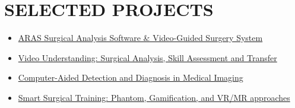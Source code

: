 \documentclass[11pt,a4paper,sans]{moderncv} %
\begin{document}
		\section{SELECTED PROJECTS}
	\begin{itemize}
		\item \href{https://aras.kntu.ac.ir/research-themes/ai-and-vr-in-medical-robotics/#:~:text=Real%2DTime%20Analyzer%20(-,ESERA,-)%0AThis%20software}{\authorimg{Images/aras.png} ARAS Surgical Analysis Software \& Video-Guided Surgery System} 
		
        \vspace{1em}
          \item \href{https://aras.kntu.ac.ir/research-themes/ai-and-vr-in-medical-robotics/#:~:text=Video%20Understanding%20in%20Medical%20Application%3A%20Surgical%20Analysis%2C%20Skill%20Assessment%20and%20Transfer}{\authorimg{Images/aras.png} Video Understanding: Surgical Analysis, Skill Assessment and Transfer} 
        \vspace{1em}
          \item \href{https://aras.kntu.ac.ir/research-themes/ai-and-vr-in-medical-robotics/#:~:text=Computer%2DAided%20Detection%20and%20Diagnosis%20in%20Medical%20Imaging}{\authorimg{Images/aras.png} Computer-Aided Detection and Diagnosis in Medical Imaging} 
        \vspace{1em}
          \item \href{https://aras.kntu.ac.ir/research-themes/ai-and-vr-in-medical-robotics/#:~:text=Smart%20Surgical%20Training%3A%20Phantom%2C%20Gamification%2C%20and%20VR/MR%20approaches}{\authorimg{Images/aras.png} Smart Surgical Training: Phantom, Gamification, and VR/MR approaches} 
  

\end{itemize}
\end{document}
